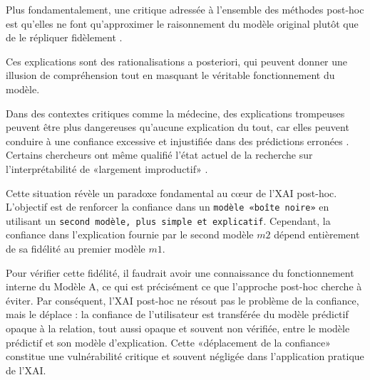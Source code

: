 Plus fondamentalement, une critique adressée à l'ensemble des méthodes post-hoc est qu'elles ne font qu'approximer le raisonnement du modèle original plutôt que de le répliquer fidèlement \citep{Rudin2019, Lipton2018}. 

Ces explications sont des rationalisations a posteriori, qui peuvent donner une illusion de compréhension tout en masquant le véritable fonctionnement du modèle. 

Dans des contextes critiques comme la médecine, des explications trompeuses peuvent être plus dangereuses qu'aucune explication du tout, car elles peuvent conduire à une confiance excessive et injustifiée dans des prédictions erronées \citet{Ghassemi2021}. Certains chercheurs ont même qualifié l'état actuel de la recherche sur l'interprétabilité de «largement improductif» \citet{Räuker2023}.

Cette situation révèle un paradoxe fondamental au cœur de l'XAI post-hoc. L'objectif est de renforcer la confiance dans un \texttt{modèle «boîte noire»} en utilisant un \texttt{second modèle, plus simple et explicatif}. Cependant, la confiance dans l'explication fournie par le second modèle $m2$ dépend entièrement de sa fidélité au premier modèle $m1$. 

Pour vérifier cette fidélité, il faudrait avoir une connaissance du fonctionnement interne du Modèle A, ce qui est précisément ce que l'approche post-hoc cherche à éviter. Par conséquent, l'XAI post-hoc ne résout pas le problème de la confiance, mais le déplace : la confiance de l'utilisateur est transférée du modèle prédictif opaque à la relation, tout aussi opaque et souvent non vérifiée, entre le modèle prédictif et son modèle d'explication. Cette «déplacement de la confiance» constitue une vulnérabilité critique et souvent négligée dans l'application pratique de l'XAI.

